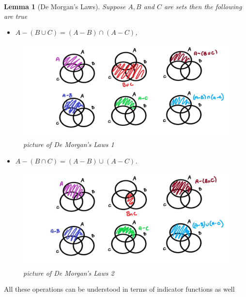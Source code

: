 \documentclass[
]{book}
\providecommand{\tightlist}{%
  \setlength{\itemsep}{0pt}\setlength{\parskip}{0pt}}
\newtheorem{lemma}{Lemma}[chapter]
\theoremstyle{definition}
\theoremstyle{definition}
\theoremstyle{definition}
\theoremstyle{definition}
\theoremstyle{remark}
\begin{document}
\begin{lemma}[De Morgan's Laws]

Suppose \(A, B\) and \(C\) are sets then the following are true

\begin{itemize}
\tightlist
\item
  \(A - (B \cup C) = (A-B)\cap(A-C)\),
\end{itemize}

\begin{figure}
\centering
\includegraphics{demorgan1.png}
\caption{\label{fig:unnamed-chunk-15}picture of De Morgan's Laws 1}
\end{figure}

\begin{itemize}
\tightlist
\item
  \(A - (B \cap C) = (A-B)\cup(A-C)\).
\end{itemize}

\begin{figure}
\centering
\includegraphics{demorgan2.png}
\caption{\label{fig:unnamed-chunk-16}picture of De Morgan's Laws 2}
\end{figure}

\end{lemma}

All these operations can be understood in terms of indicator functions as well
\end{document}
